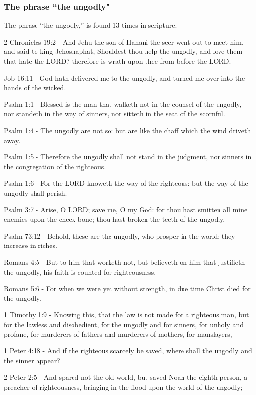 \subsubsection{The phrase ``the ungodly"}

The phrase ``the ungodly,'' is found 13 times in scripture.

\begin{compactenum}
    \item 2 Chronicles 19:2 - And Jehu the son of Hanani the seer went out to meet him, and said to king Jehoshaphat, Shouldest thou help the ungodly, and love them that hate the LORD? therefore is wrath upon thee from before the LORD.
    \item Job 16:11 -  God hath delivered me to the ungodly, and turned me over into the hands of the wicked.
    \item Psalm 1:1 - Blessed is the man that walketh not in the counsel of the ungodly, nor standeth in the way of sinners, nor sitteth in the seat of the scornful.
    \item Psalm 1:4 - The ungodly are not so: but are like the chaff which the wind driveth away.
    \item Psalm 1:5 - Therefore the ungodly shall not stand in the judgment, nor sinners in the congregation of the righteous.
    \item Psalm 1:6 - For the LORD knoweth the way of the righteous: but the way of the ungodly shall perish.
    \item Psalm 3:7 - Arise, O LORD; save me, O my God: for thou hast smitten all mine enemies upon the cheek bone; thou hast broken the teeth of the ungodly.
    \item Psalm 73:12 - Behold, these are the ungodly, who prosper in the world; they increase in riches.
    \item Romans 4:5 - But to him that worketh not, but believeth on him that justifieth the ungodly, his faith is counted for righteousness.
    \item Romans 5:6 - For when we were yet without strength, in due time Christ died for the ungodly.
    \item 1 Timothy 1:9 - Knowing this, that the law is not made for a righteous man, but for the lawless and disobedient, for the ungodly and for sinners, for unholy and profane, for murderers of fathers and murderers of mothers, for manslayers,
    \item 1 Peter 4:18 - And if the righteous scarcely be saved, where shall the ungodly and the sinner appear?
    \item 2 Peter 2:5 - And spared not the old world, but saved Noah the eighth person, a preacher of righteousness, bringing in the flood upon the world of the ungodly;
\end{compactenum}